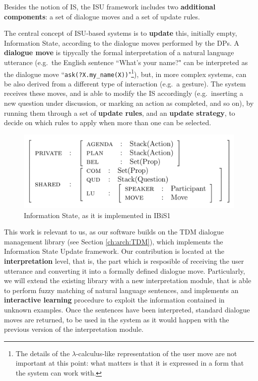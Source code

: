 Besides the notion of IS, the ISU framework includes two \textbf{additional components}: a set of dialogue moves and a set of update rules.

The central concept of ISU-based systems is to \textbf{update} this, initially empty, Information State, according to the dialogue moves performed by the DPs. A \textbf{dialogue move} is tipycally the formal interpretation of a natural language utterance (e.g.\ the English sentence ``What's your name?" can be interpreted as the dialogue move ``\texttt{ask(?X.my\_name(X))}"\footnote{The details of the $\lambda$-calculus-like representation of the user move are not important at this point: what matters is that it is expressed in a form that the system can work with.}), but, in more complex systems, can be also derived from a different type of interaction (e.g.\ a gesture). The system receives these moves, and is able to modify the IS accordingly (e.g.\ inserting a new question under discussion, or marking an action as completed, and so on), by running them through a set of \textbf{update rules}, and an \textbf{update strategy}, to decide on which rules to apply when more than one can be selected.

\begin{figure}
	\centering
	\includegraphics{Pictures/ibis1_is.png}
	\caption{Information State, as it is implemented in IBiS1}
	\label{ch:rw:ds:isu:ibisis}
\end{figure}

This work is relevant to us, as our software builds on the TDM dialogue management library (see Section \ref{ch:arch:TDM}), which implements the Information State Update framework. Our contribution is located at the \textbf{interpretation} level, that is, the part which is resposible of receiving the user utterance and converting it into a formally defined dialogue move. Particularly, we will extend the existing library with a new interpretation module, that is able to perform fuzzy matching of natural language sentences, and implements an \textbf{interactive learning} procedure to exploit the information contained in unknown examples. Once the sentences have been interpreted, standard dialogue moves are returned, to be used in the system as it would happen with the previous version of the interpretation module.

